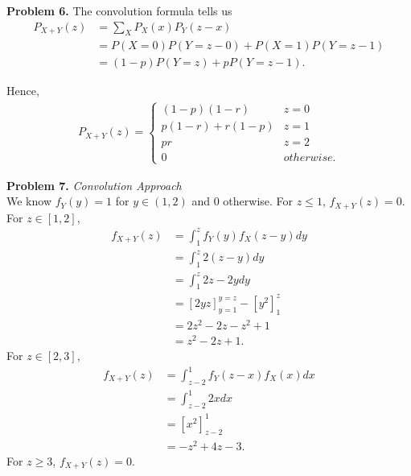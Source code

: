 \documentclass{article}
\begin{document}
\textbf{Problem 6.}
The convolution formula tells us
\begin{align}
    P_{X+Y}(z) & = \sum_{X}P_X(x)P_Y(z-x) \\
    & = P(X=0)P(Y=z-0)+P(X=1)P(Y=z-1) \\
    & = (1-p)P(Y=z)+pP(Y=z-1).
\end{align}

Hence,
\begin{align}
    P_{X+Y}(z) = 
    \begin{cases}
        (1-p)(1-r) & z = 0 \\
        p(1-r)+r(1-p) & z = 1 \\
        pr & z = 2 \\
        0 & otherwise.
    \end{cases}
\end{align}
\bigbreak

\textbf{Problem 7.}
\emph{Convolution Approach} \\
We know $f_Y(y)=1$ for $y \in (1,2)$ and 0 otherwise. For $z \le 1$, $f_{X+Y}(z)=0$.
For $z \in [1,2]$,
\begin{align}
    f_{X+Y}(z) & = \int_{1}^{z}f_Y(y)f_X(z-y)dy \\ 
    & = \int_{1}^{z}2(z-y)dy \\
    & = \int_{1}^{z}2z - 2y dy \\
    & = \left[2yz\right]_{y=1}^{y=z}-\left[y^2\right]_1^z \\
    & = 2z^2-2z-z^2+1 \\
    & = z^2-2z+1.
\end{align}
For $z \in [2,3]$,
\begin{align}
    f_{X+Y}(z) & = \int_{z-2}^{1}f_Y(z-x)f_X(x)dx \\
    & = \int_{z-2}^{1}2xdx \\
    & = \left[x^2\right]_{z-2}^1 \\
    & = -z^2+4z-3.
\end{align}
For $z\ge 3$, $f_{X+Y}(z)=0$.
\bigbreak
\end{document}
